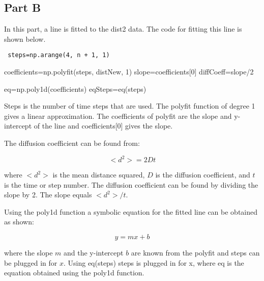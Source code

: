 \documentclass[12pt]{article}
\begin{document}
\subsection{Part B}

\noindent In this part, a line is fitted to the dist2 data. The code for fitting this line is shown below. \newline

{\tt 
	\noindent steps=np.arange(4, n + 1, 1)                   \newline    
	
	\noindent coefficients=np.polyfit(steps, distNew, 1)     \newline 
	\noindent slope=coefficients[0]                          \newline          
	\noindent diffCoeff=slope/2                              \newline         
	
	\noindent eq=np.poly1d(coefficients)                     \newline               
	\noindent eqSteps=eq(steps)   }                          \newline


\noindent Steps is the number of time steps that are used. The polyfit function of degree 1 gives a linear approximation. The coefficients of polyfit are the slope and y-intercept of the line and coefficients[0] gives the slope. \newline

\noindent The diffusion coefficient can be found from:

\begin{equation}
<d^2>=2Dt
\end{equation}

\noindent where $<d^2>$ is the mean distance squared, $D$ is the diffusion coefficient, and $t$ is the time or step number. The diffusion coefficient can be found by dividing the slope by 2. The slope equals $<d^2>/t$.\newline

\noindent Using the poly1d function a symbolic equation for the fitted line can be obtained as shown:

\begin{equation}
y=mx+b
\end{equation}

\noindent where the slope $m$ and the y-intercept $b$ are known from the polyfit and steps can be plugged in for $x$.  Using eq(steps) steps is plugged in for x, where eq is the equation obtained using the poly1d function. \newline
\end{document}
